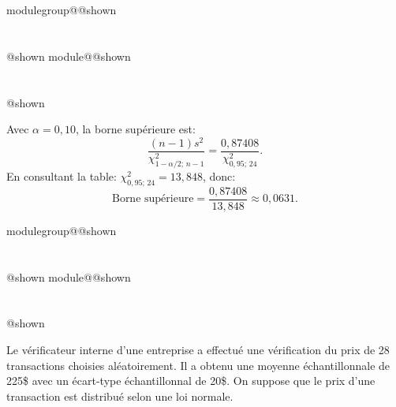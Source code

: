 \documentclass{Evaluation}
\makeatletter
\newcommand{\currentmodulekey}{}
\newcommand{\currentmoduletitle}{}
\newcommand{\currentgroupkey}{}
\newcommand{\currentgrouptitle}{}
\newcommand{\showmoduleifneeded}{%
  \ifx\currentgroupkey\empty\else
    \expandafter\ifx\csname modulegroup@\currentgroupkey @shown\endcsname\relax
      \section*{\currentgrouptitle}%
      \expandafter\gdef\csname modulegroup@\currentgroupkey @shown\endcsname{1}%
    \fi
  \fi
  \expandafter\ifx\csname module@\currentmodulekey @shown\endcsname\relax
    \section*{\currentmoduletitle}%
    \expandafter\gdef\csname module@\currentmodulekey @shown\endcsname{1}%
  \fi
}
\newenvironment{A22}{\showmoduleifneeded}{}
\newenvironment{A24}{\showmoduleifneeded}{}
\makeatother
\begin{document}
\begin{questions}
\begin{A24}
\begin{parts}
    \begin{solution}
    Avec $\alpha = 0{,}10$, la borne supérieure est:
    \[
    \frac{(n-1)s^2}{\chi^2_{1-\alpha/2;\,n-1}} = \frac{0{,}87408}{\chi^2_{0{,}95;\,24}}.
    \]
    En consultant la table: $\chi^2_{0{,}95;\,24} = 13{,}848$, donc:
    \[
    \text{Borne supérieure} = \frac{0{,}87408}{13{,}848} \approx 0{,}0631.
    \]
    \end{solution}

\end{parts}
\end{A24}

\begin{A22}
\question {} %
\bigskip
Le vérificateur interne d'une entreprise  a effectué une vérification du prix de 28 transactions choisies aléatoirement. Il a obtenu une  moyenne échantillonnale de 225\$ avec un écart-type échantillonnal de 20\$. On suppose que le prix d'une transaction est distribué selon une loi normale.

\end{A22}
\end{questions}
\end{document}
